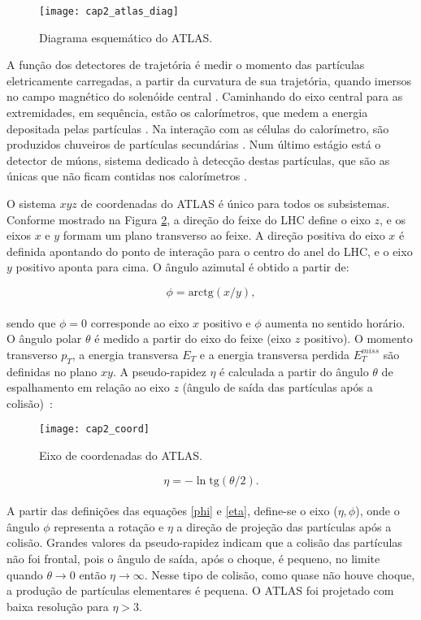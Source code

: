 \begin{figure}[h!]
\centering
\texttt{[image: cap2\_atlas\_diag]}
\caption{Diagrama esquemático do ATLAS.} \label{atlas_diag}
\end{figure}

A função dos detectores de trajetória é medir o momento das
partículas ele\-tri\-camente carregadas, a partir da curvatura de sua
trajetória, quando imersos no campo magnético do solenóide central \cite{atlastracking:2007}.
Caminhando do eixo central para as extre\-mi\-dades, em sequência,
estão os calorímetros, que medem a energia depositada pelas
partículas \cite{atlascalo:2002}. Na interação com as células do calorímetro, são
produzidos chuveiros de partículas secundárias \cite{book:wigmans:2000}. Num último estágio
está o detector de múons, sistema dedicado à detecção destas partículas, que são as únicas que
não ficam contidas nos calorímetros \cite{atlasmuon:2004}.

O sistema $xyz$ de coordenadas do ATLAS é único para todos os
subsistemas. Conforme mostrado na Figura \ref{atlas_coord}, a
direção do feixe do LHC define o eixo $z$, e os eixos $x$ e $y$
formam um plano transverso ao feixe. A direção positiva do eixo $x$
é definida apontando do ponto de interação para o centro do anel do
LHC, e o eixo $y$ positivo aponta para cima. O ângulo azimutal é
obtido a partir de:

\begin{equation}\label{phi}
   \phi=\textrm{arctg}(x/y),
\end{equation}
\\
sendo que $\phi=0$ corresponde ao eixo $x$ positivo e $\phi$ aumenta
no sentido horário. O ângulo polar $\theta$ é medido a partir do
eixo do feixe (eixo $z$ positivo). O momento transverso $p_T$, a
energia transversa $E_T$ e a energia transversa perdida $E_T^{miss}$
são definidas no plano $xy$. A pseudo-rapidez $\eta$ é calculada a
partir do ângulo $\theta$ de es\-pa\-lha\-mento em relação ao eixo
$z$ (ângulo de saída das partículas após a
colisão)~\cite{LI:ATLAS:1992}:

\begin{figure}[b!] \centering
\texttt{[image: cap2\_coord]}
\caption{Eixo de coordenadas do ATLAS.} \label{atlas_coord}
\end{figure}

\begin{equation}\label{eta}
    \eta=-\ln\textrm{tg}(\theta /2).
\end{equation}
\\
A partir das definições das equações \ref{phi} e \ref{eta},
define-se o eixo ($\eta,\phi$), onde o ângulo $\phi$ representa a
rotação e $\eta$ a direção de projeção das partículas após a
colisão. Grandes valores da pseudo-rapidez indicam que a colisão das
partículas não foi frontal, pois o ângulo de saída, após o choque, é
pequeno, no limite quando $\theta \rightarrow 0$ então $\eta
\rightarrow \infty$. Nesse tipo de colisão, como quase não houve
choque, a produção de partículas elementares é pequena. O ATLAS foi
projetado com baixa resolução para $\eta>3$.

